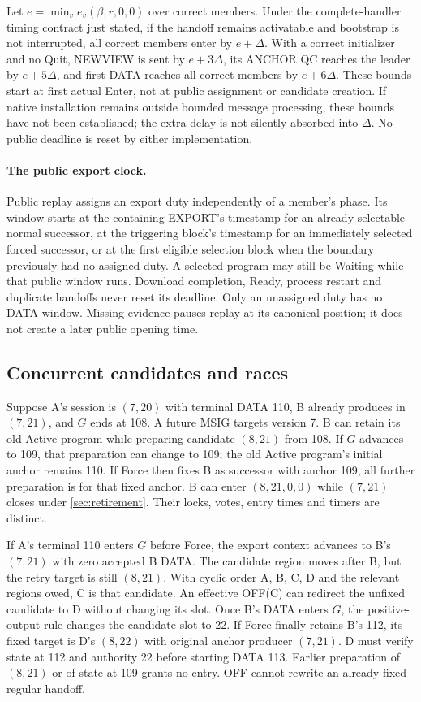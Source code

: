 \documentclass[11pt,a4paper]{article}
\begin{document}
Let $e=\min_v e_v(\beta,r,0,0)$ over correct members. Under the
complete-handler timing contract just stated, if the handoff remains
activatable and bootstrap is not interrupted, all correct members enter
by $e+\Delta$. With a correct initializer and no Quit, NEWVIEW is sent
by $e+3\Delta$, its ANCHOR QC reaches the leader by $e+5\Delta$, and
first DATA reaches all correct members by $e+6\Delta$. These bounds
start at first actual Enter, not at public assignment or candidate creation.
If native installation remains outside bounded message processing, these
bounds have not been established; the extra delay is not silently absorbed
into $\Delta$. No public deadline is reset by either implementation.

\paragraph{The public export clock.}
Public replay assigns an export duty independently of a member's
phase. Its window starts at the containing EXPORT's timestamp for
an already selectable normal successor, at the triggering block's
timestamp for an immediately selected forced successor, or at the
first eligible selection block when the boundary previously had no
assigned duty. A selected program may still be Waiting while that
public window runs. Download completion, Ready, process restart and
duplicate handoffs never reset its deadline. Only an unassigned duty
has no DATA window. Missing evidence pauses replay at its canonical
position; it does not create a later public opening time.

\subsection{Concurrent candidates and races}
\label{sec:runtime-races}
Suppose A's session is $(7,20)$ with terminal DATA 110, B already
produces in $(7,21)$, and $G$ ends at 108. A future MSIG targets
version 7. B can retain its old Active program while preparing
candidate $(8,21)$ from 108. If $G$ advances to 109, that preparation
can change to 109; the old Active program's initial anchor remains
110. If Force then fixes B as successor with anchor 109, all further
preparation is for that fixed anchor. B can enter $(8,21,0,0)$ while
$(7,21)$ closes under \cref{sec:retirement}. Their locks, votes,
entry times and timers are distinct.

If A's terminal 110 enters $G$ before Force, the export context
advances to B's $(7,21)$ with zero accepted B DATA. The candidate region
moves after B, but the retry target is still $(8,21)$. With cyclic order
A, B, C, D and the relevant regions owed, C is that candidate. An effective
OFF(C) can redirect the unfixed candidate to D without changing its slot.
Once B's DATA enters $G$, the positive-output rule changes the candidate
slot to 22. If Force finally retains B's 112, its fixed target is D's
$(8,22)$ with original anchor producer $(7,21)$. D must verify state at
112 and authority 22 before starting DATA 113.
Earlier preparation of $(8,21)$ or of state at 109 grants no entry.
OFF cannot rewrite an already fixed regular handoff.
\end{document}
